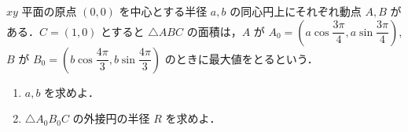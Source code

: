 \documentclass[../../main.tex]{subfiles}
\begin{document}
$xy$ 平面の原点 $(0,0)$ を中心とする半径 $a, b$ の同心円上にそれぞれ動点 $A, B$ がある．$C=(1,0)$ とすると $\triangle ABC$ の面積は，$A$ が $A_0 = \left(a\cos\dfrac{3\pi}{4}, a\sin\dfrac{3\pi}{4}\right)$, $B$ が
$B_0 = \left(b\cos\dfrac{4\pi}{3}, b\sin\dfrac{4\pi}{3}\right)$ のときに最大値をとるという．

\begin{enumerate}
  \item $a, b$ を求めよ．
  \item $\triangle A_0 B_0 C$ の外接円の半径 $R$ を求めよ．
\end{enumerate}
\end{document}
